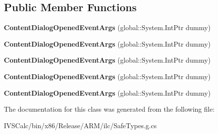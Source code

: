 \subsection*{Public Member Functions}
\begin{DoxyCompactItemize}
\item 
\mbox{\label{class_windows_1_1_u_i_1_1_xaml_1_1_controls_1_1_content_dialog_opened_event_args_a66d4eaff67d4b51b39b643241c15eded}} 
{\bfseries Content\+Dialog\+Opened\+Event\+Args} (global\+::\+System.\+Int\+Ptr dummy)
\item 
\mbox{\label{class_windows_1_1_u_i_1_1_xaml_1_1_controls_1_1_content_dialog_opened_event_args_a66d4eaff67d4b51b39b643241c15eded}} 
{\bfseries Content\+Dialog\+Opened\+Event\+Args} (global\+::\+System.\+Int\+Ptr dummy)
\item 
\mbox{\label{class_windows_1_1_u_i_1_1_xaml_1_1_controls_1_1_content_dialog_opened_event_args_a66d4eaff67d4b51b39b643241c15eded}} 
{\bfseries Content\+Dialog\+Opened\+Event\+Args} (global\+::\+System.\+Int\+Ptr dummy)
\item 
\mbox{\label{class_windows_1_1_u_i_1_1_xaml_1_1_controls_1_1_content_dialog_opened_event_args_a66d4eaff67d4b51b39b643241c15eded}} 
{\bfseries Content\+Dialog\+Opened\+Event\+Args} (global\+::\+System.\+Int\+Ptr dummy)
\item 
\mbox{\label{class_windows_1_1_u_i_1_1_xaml_1_1_controls_1_1_content_dialog_opened_event_args_a66d4eaff67d4b51b39b643241c15eded}} 
{\bfseries Content\+Dialog\+Opened\+Event\+Args} (global\+::\+System.\+Int\+Ptr dummy)
\end{DoxyCompactItemize}


The documentation for this class was generated from the following file\+:\begin{DoxyCompactItemize}
\item 
I\+V\+S\+Calc/bin/x86/\+Release/\+A\+R\+M/ilc/Safe\+Types.\+g.\+cs\end{DoxyCompactItemize}
